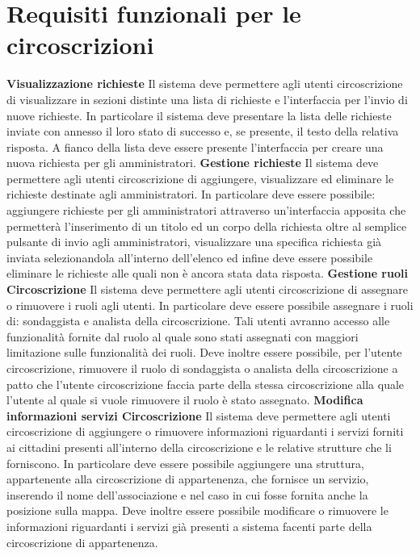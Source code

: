     \section{Requisiti funzionali per le circoscrizioni}
        \begin{rfList}
            \rfItem \textbf{Visualizzazione richieste} Il sistema deve permettere agli utenti circoscrizione di visualizzare in sezioni distinte una lista di richieste e l'interfaccia per l'invio di nuove richieste. In particolare il sistema deve presentare la lista delle richieste inviate con annesso il loro stato di successo e, se presente, il testo della relativa risposta. A fianco della lista deve essere presente l'interfaccia per creare una nuova richiesta per gli amministratori.
            \rfItem \textbf{Gestione richieste} Il sistema deve permettere agli utenti circoscrizione di aggiungere, visualizzare ed eliminare le richieste destinate agli amministratori. In particolare deve essere possibile: aggiungere richieste per gli amministratori attraverso un'interfaccia apposita che permetterà l'inserimento di un titolo ed un corpo della richiesta oltre al semplice pulsante di invio agli amministratori, visualizzare una specifica richiesta già inviata selezionandola all'interno dell'elenco ed infine deve essere possibile eliminare le richieste alle quali non è ancora stata data risposta.
            \rfItem \textbf{Gestione ruoli Circoscrizione} Il sistema deve permettere agli utenti circoscrizione di assegnare o rimuovere i ruoli agli utenti. In particolare deve essere possibile assegnare i ruoli di: sondaggista e analista della circoscrizione. Tali utenti avranno accesso alle funzionalità fornite dal ruolo al quale sono stati assegnati con maggiori limitazione sulle funzionalità dei ruoli. Deve inoltre essere possibile, per l'utente circoscrizione, rimuovere il ruolo di sondaggista o analista della circoscrizione a patto che l'utente circoscrizione faccia parte della stessa circoscrizione alla quale l'utente al quale si vuole rimuovere il ruolo è stato assegnato.
            \rfItem \textbf{Modifica informazioni servizi Circoscrizione} Il sistema deve permettere agli utenti circoscrizione di aggiungere o rimuovere informazioni riguardanti i servizi forniti ai cittadini presenti all'interno della circoscrizione e le relative strutture che li forniscono. In particolare deve essere possibile aggiungere una struttura, appartenente alla circoscrizione di appartenenza, che fornisce un servizio, inserendo il nome dell'associazione e nel caso in cui fosse fornita anche la posizione sulla mappa. Deve inoltre essere possibile modificare o rimuovere le informazioni riguardanti i servizi già presenti a sistema facenti parte della circoscrizione di appartenenza.
        \end{rfList}
